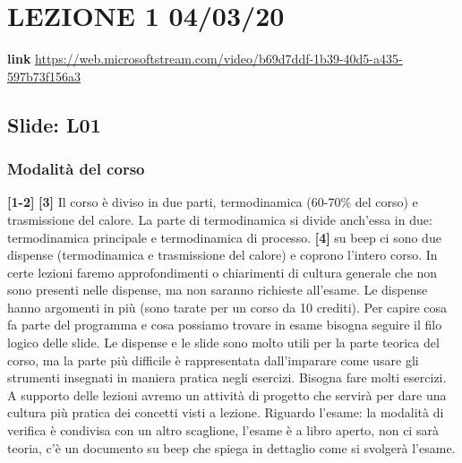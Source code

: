 \section*{LEZIONE 1 04/03/20}
\textbf{link} \url{https://web.microsoftstream.com/video/b69d7ddf-1b39-40d5-a435-597b73f156a3}
\subsection*{Slide: L01}
\subsubsection*{Modalità del corso}
\textbf{[1-2]}\;\newline
\textbf{[3]}\; Il corso è diviso in due parti, termodinamica (60-70\% del corso) e trasmissione del calore. La parte di termodinamica si divide anch'essa in due: termodinamica principale e termodinamica di processo.\newline
\textbf{[4]}\; su beep ci sono due dispense (termodinamica e trasmissione del calore) e coprono l'intero corso. In certe lezioni faremo approfondimenti o chiarimenti di cultura generale che non sono presenti nelle dispense, ma non saranno richieste all'esame. Le dispense hanno argomenti in più (sono tarate per un corso da 10 crediti). Per capire cosa fa parte del programma e cosa possiamo trovare in esame bisogna seguire il filo logico delle slide. Le dispense e le slide sono molto utili per la parte teorica del corso, ma la parte più difficile è rappresentata dall'imparare come usare gli strumenti insegnati in maniera pratica negli esercizi. Bisogna fare molti esercizi. A supporto delle lezioni avremo un attività di progetto che servirà per dare una cultura più pratica dei concetti visti a lezione.\newline
Riguardo l'esame: la modalità di verifica è condivisa con un altro scaglione, l'esame è a libro aperto, non ci sarà teoria, c'è un documento su beep che spiega in dettaglio come si svolgerà l'esame.

